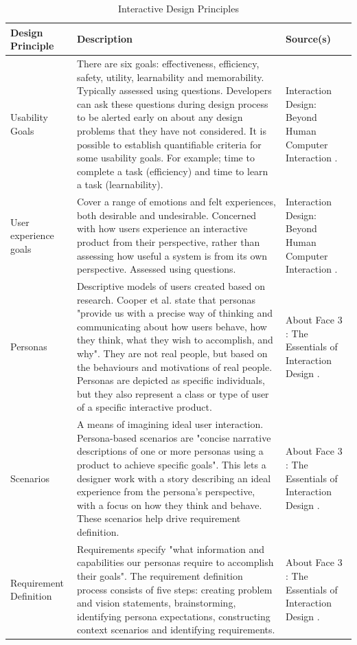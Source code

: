 \documentclass[authoryearcitations]{UoYCSproject}
\begin{document}
\begin{table}[tbp]
	\begin{small}
	\center
   \caption{Interactive Design Principles}
  \begin{tabular}{ p{2.0cm} p{9.0cm}  p{2.5cm} }
  		\hline
      \textbf{Design Principle} & \textbf{Description} & \textbf{Source(s)}\\ \hline
    Usability Goals & There are six goals: effectiveness, efficiency, safety, utility, learnability and memorability. Typically assessed using questions. Developers can ask these questions during design process to be alerted early on about any design problems that they have not considered. It is possible to establish quantifiable criteria for some usability goals. For example; time to complete a task (efficiency) and time to learn a task (learnability).  &  Interaction Design: Beyond Human Computer Interaction \citep{Rogers2011}.\\  
     User experience goals & Cover a range of emotions and felt experiences, both desirable and undesirable. Concerned with how users experience an interactive product from their perspective, rather than assessing how useful a system is from its own perspective. Assessed using questions.  &  Interaction Design: Beyond Human Computer Interaction \citep{Rogers2011}.\\ 
       Personas & Descriptive models of users created based on research. Cooper et al. state that personas "provide us with a precise way of thinking and communicating about how users behave, how they think, what they wish to accomplish, and why". They are not real people, but based on the behaviours and motivations of real people. Personas are depicted as specific individuals, but they also represent a class or type of user of a specific interactive product.  &  About Face 3 : The Essentials of Interaction Design \citep{Cooper2007}. \\  
       Scenarios & A means of imagining ideal user interaction. Persona-based scenarios are "concise narrative descriptions of one or more personas using a product to achieve specific goals". This lets a designer work with a story describing an ideal experience from the persona's perspective, with a focus on how they think and behave. These scenarios help drive requirement definition.  &  About Face 3 : The Essentials of Interaction Design \citep{Cooper2007}.\\ 
       Requirement Definition & Requirements specify "what information and capabilities our personas require to accomplish their goals". The requirement definition process consists of five steps: creating problem and vision statements, brainstorming, identifying persona expectations, constructing context scenarios and identifying requirements. &  About Face 3 : The Essentials of Interaction Design \citep{Cooper2007}.\\ \hline
  \end{tabular}
  \end{small}
  \label{tab:designprinciples}
\end{table}
\end{document}
